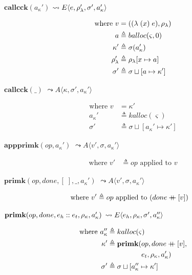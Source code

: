 \documentclass[12pt,draft]{article}
\newcommand\mdoubleplus{\ensuremath{\mathbin{+\mkern-9mu+}}}
\newcommand{\singlelamsyn}[2]{(\lambda\;(#1)\;#2)}
\newcommand{\store}[0]{\sigma}
\newcommand{\baddr}[0]{a}
\newcommand{\kaddr}[0]{a_{\kappa}}
\newcommand{\kont}[0]{\kappa}
\newcommand{\state}[0]{\varsigma}
\newcommand{\E}[4]{E\langle #1 , #2 , #3 , #4 \rangle}
\newcommand{\A}[3]{A\langle #1 , #2 , #3 \rangle}
\begin{document}
\begin{multicols*}{2}
\begin{center}
  $\textbf{callcck}(\kaddr')$
  $\leadsto \E{e}{\lamenv'}{\store'}{\kaddr'}$
\end{center}
\vspace{-7mm}
\begin{align*}
  \text{where }
  v &= (\singlelamsyn{x}{e} , \lamenv) \\
  \baddr &\triangleq balloc(\state, 0) \\
  \kont' &\triangleq \store(\kaddr') \\
  \lamenv' &\triangleq \lamenv[x \mapsto \baddr] \\
  \store' &\triangleq \store \sqcup [\baddr \mapsto \kont']
\end{align*}
\begin{center}
  $\textbf{callcck}(\_)$
  $\leadsto \A{\kont}{\store'}{\kaddr'}$
\end{center}
\vspace{-7mm}
\begin{align*}
  \text{where }
  v &= \kont' \\
  \kaddr' &\triangleq kalloc(\state) \\
  \store' &\triangleq \store \sqcup [\kaddr' \mapsto \kont']
\end{align*}
\begin{center}
  $\textbf{appprimk}(op, \kaddr')$
  $\leadsto \A{v'}{\store}{\kaddr'}$
\end{center}
\vspace{-7mm}
\begin{align*}
\text{where } v' &\triangleq op \text{ applied to } v
\end{align*}
\begin{center}
  $\textbf{primk}(op , done , [\;] , \_ , \kaddr')$
  $\leadsto \A{v'}{\store}{\kaddr'}$
\end{center}
\vspace{-7mm}
\begin{align*}
\text{where } v' &\triangleq op \text{ applied to } (done \mdoubleplus [v])
\end{align*}
\begin{center}
  $\textbf{primk}(op, done, e_h::e_t, \kenv, \kaddr')$
  $\leadsto \E{e_h}{\kenv}{\store'}{\kaddr''}$
\end{center}
\vspace{-7mm}
\begin{align*}
  \text{where }
  \kaddr'' &\triangleq kalloc(\state) \\
  \kont' &\triangleq \textbf{primk}(op, done \mdoubleplus [v],\\
           &\;\;\;\;\;\;\;\;\;\;\;\;\;\;\;\;\; e_t , \kenv , \kaddr') \\
  \store' &\triangleq \store \sqcup [\kaddr'' \mapsto \kont']
\end{align*}
\end{multicols*}
\newpage
\end{document}
